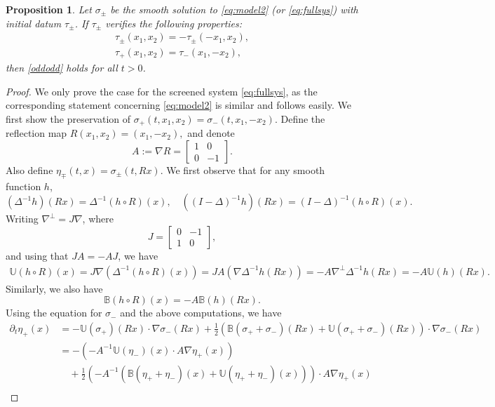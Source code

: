 \documentclass[11pt,reqno]{amsproc}
\newcommand{\na}{\nabla}
\newtheorem{prop}{Proposition}
\newcommand{\B}{\mathbb{B}}
\newcommand{\U}{\mathbb{U}}
\newcommand{\p}{\partial}
\newcommand{\pt}{\p_t}
\begin{document}
\begin{prop}
    \label{prop:symmetry}
    Let $\sigma_\pm$ be the smooth solution to \eqref{eq:model2} (or \eqref{eq:fullsys}) with initial datum $\tau_\pm$. If $\tau_\pm$ verifies the following properties:
    \begin{align*}
        \tau_\pm (x_1,x_2) = -\tau_{\pm}(-x_1,x_2),\\
    \tau_+(x_1,x_2) = \tau_-(x_1,-x_2),
    \end{align*}
    then \eqref{oddodd} holds for all $t > 0$.
\end{prop}
\begin{proof}
    We only prove the case for the screened system \eqref{eq:fullsys}, as the corresponding statement concerning \eqref{eq:model2} is similar and follows easily. We first show the preservation of $\sigma_+(t,x_1,x_2) = \sigma_-(t,x_1,-x_2)$. Define the reflection map
    $
    R(x_1,x_2) = (x_1,-x_2),
    $
    and denote 
    $$
    A := \nabla R = \begin{bmatrix}
        1 & 0\\
        0 & -1
    \end{bmatrix}.
    $$
    Also define $\eta_\mp (t,x) = \sigma_\pm(t,Rx)$. We first observe that for any smooth function $h$,
    $$
    (\Delta^{-1} h)(Rx) = \Delta^{-1} (h\circ R)(x),\quad ((I -\Delta)^{-1}h)(Rx) = (I -\Delta)^{-1}(h\circ R)(x).
    $$
    Writing $\nabla^\perp = J\nabla$, where
    $$
    J = \begin{bmatrix}
        0 & -1\\
        1 & 0
    \end{bmatrix},
    $$
    and using that $JA = -AJ$, we have
    \begin{align*}
        \U(h\circ R)(x) = J\nabla(\Delta^{-1} (h\circ R)(x)) = JA(\nabla\Delta^{-1} h(Rx)) = -A\nabla^\perp \Delta^{-1} h(Rx) = -A\U(h)(Rx).
    \end{align*}
    Similarly, we also have
    $$
    \B(h\circ R)(x) = -A\B(h) (Rx).
    $$
    Using the equation for $\sigma_-$ and the above computations, we have
    \begin{align*}
        \pt \eta_+(x) &= -\U(\sigma_+)(Rx) \cdot \nabla \sigma_-(Rx) + \frac12(\B(\sigma_+ + \sigma_-)(Rx) + \U(\sigma_+ + \sigma_-)(Rx)) \cdot \na \sigma_-(Rx)\\
        &= -\left(-A^{-1}\U(\eta_-)(x) \cdot A\na \eta_+(x)\right)\\
        &\quad + \frac12 \left(-A^{-1}\left(\B(\eta_+ + \eta_-)(x) + \U(\eta_+ + \eta_-)(x)\right)\right) \cdot A\na \eta_+(x)\\

\end{align*}
\end{proof}
\end{document}
